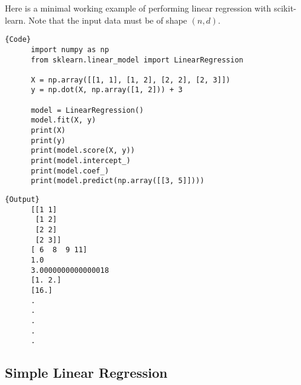   \begin{code}
    Here is a minimal working example of performing linear regression with scikit-learn. Note that the input data must be of shape $(n, d)$. 

    \noindent\begin{minipage}{.6\textwidth}
    \begin{lstlisting}[]{Code}
      import numpy as np 
      from sklearn.linear_model import LinearRegression 

      X = np.array([[1, 1], [1, 2], [2, 2], [2, 3]]) 
      y = np.dot(X, np.array([1, 2])) + 3 

      model = LinearRegression()  
      model.fit(X, y) 
      print(X) 
      print(y)
      print(model.score(X, y))  
      print(model.intercept_)
      print(model.coef_) 
      print(model.predict(np.array([[3, 5]])))
    \end{lstlisting}
    \end{minipage}
    \hfill
    \begin{minipage}{.39\textwidth}
    \begin{lstlisting}[]{Output}
      [[1 1]
       [1 2]
       [2 2]
       [2 3]]
      [ 6  8  9 11]
      1.0
      3.0000000000000018
      [1. 2.]
      [16.]
      .
      .
      .
      .
      .
    \end{lstlisting}
    \end{minipage}
  \end{code}

\subsection{Simple Linear Regression}

